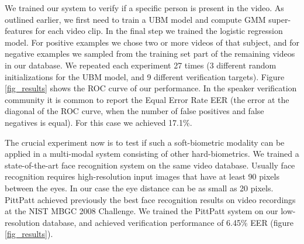 \documentclass[times, 10pt,twocolumn]{article}
\begin{document}
We trained our system to verify if a specific person is present in the video.  As outlined earlier, we first need to train a UBM model and compute GMM super-features for each video clip.  In the final step we trained the logistic regression model. For positive examples we chose two or more videos of that subject, and for negative examples we sampled from the training set part of the remaining videos in our database.  We repeated each experiment 27 times (3 different random initializations for the UBM model, and 9 different verification targets).   Figure \ref{fig_results} shows the ROC curve of our performance.  In the speaker verification community it is common to report the Equal Error Rate EER (the error at the diagonal of the ROC curve, when the number of false positives and false negatives is equal).  For this case we achieved 17.1\%.   

The crucial experiment now is to test if such a soft-biometric modality can be applied in a multi-modal system consisting of other hard-biometrics.  We trained a state-of-the-art face recognition system on the same video database.  Usually face recognition requires high-resolution input images that have at least 90 pixels between the eyes. In our case the eye distance can be as small as 20 pixels.  PittPatt \cite{pittpatt} achieved previously the best face recognition results on video recordings at the NIST MBGC 2008 Challenge.  We trained the PittPatt system on our low-resolution database, and achieved verification performance of 6.45\% EER (figure \ref{fig_results}).  
\end{document}
